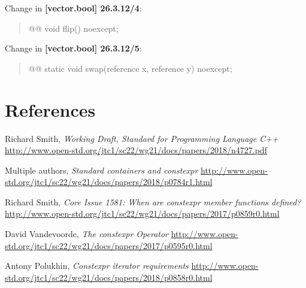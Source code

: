 \documentclass{wg21}
\begin{document}
Change in \textbf{[vector.bool] 26.3.12/4}:
\begin{quote}
\begin{itemdecl}
@@ void flip() noexcept;
\end{itemdecl}
\end{quote}

Change in \textbf{[vector.bool] 26.3.12/5}:
\begin{quote}
\begin{itemdecl}
@@ static void swap(reference x, reference y) noexcept;
\end{itemdecl}
\end{quote}


\section{References}
\renewcommand{\section}[2]{}%
\begin{thebibliography}{9}

  Richard Smith,
  \emph{Working Draft, Standard for Programming Language C++}\newline
  \url{http://www.open-std.org/jtc1/sc22/wg21/docs/papers/2018/n4727.pdf}

  Multiple authors,
  \emph{Standard containers and constexpr}\newline
  \url{http://www.open-std.org/jtc1/sc22/wg21/docs/papers/2018/p0784r1.html}

  Richard Smith,
  \emph{Core Issue 1581: When are constexpr member functions defined?}\newline
  \url{http://www.open-std.org/jtc1/sc22/wg21/docs/papers/2017/p0859r0.html}

  David Vandevoorde,
  \emph{The constexpr Operator}\newline
  \url{http://www.open-std.org/jtc1/sc22/wg21/docs/papers/2017/p0595r0.html}

  Antony Polukhin,
  \emph{Constexpr iterator requirements}\newline
  \url{http://www.open-std.org/jtc1/sc22/wg21/docs/papers/2018/p0858r0.html}

\end{thebibliography}
\end{document}
